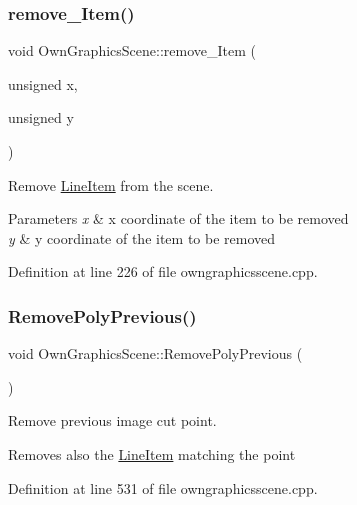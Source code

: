 \subsubsection{\texorpdfstring{remove\+\_\+\+Item()}{remove\_Item()}}
{\footnotesize\ttfamily void Own\+Graphics\+Scene\+::remove\+\_\+\+Item (\begin{DoxyParamCaption}\item[{unsigned}]{x,  }\item[{unsigned}]{y }\end{DoxyParamCaption})}



Remove \mbox{\hyperlink{classLineItem}{Line\+Item}} from the scene. 


\begin{DoxyParams}{Parameters}
{\em x} & x coordinate of the item to be removed \\
\hline
{\em y} & y coordinate of the item to be removed \\
\hline
\end{DoxyParams}


Definition at line 226 of file owngraphicsscene.\+cpp.

\mbox{\label{classOwnGraphicsScene_a4976a8e6f682612acd3e23b6c98bd8d8}} 
\subsubsection{\texorpdfstring{Remove\+Poly\+Previous()}{RemovePolyPrevious()}}
{\footnotesize\ttfamily void Own\+Graphics\+Scene\+::\+Remove\+Poly\+Previous (\begin{DoxyParamCaption}{ }\end{DoxyParamCaption})}



Remove previous image cut point. 

Removes also the \mbox{\hyperlink{classLineItem}{Line\+Item}} matching the point 

Definition at line 531 of file owngraphicsscene.\+cpp.

\mbox{\label{classOwnGraphicsScene_ae79aa179ce90ab26f06d7d17eed96b93}} 

